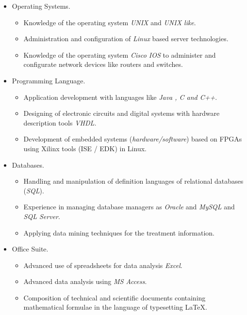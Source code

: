 \documentclass[21pt, onecolumn]{article} %
\begin{document}
\begin{itemize}
  \item Operating Systems.
\begin{itemize}
 \item Knowledge of the operating system \emph{UNIX} and \emph{UNIX like}.
 \item Administration and configuration of \emph{Linux} based server technologies.
  \item Knowledge of the operating system \emph {Cisco IOS} to administer and
 configurate network  devices like routers and switches.

\end{itemize}


\item Programming Language.
\begin{itemize}
 \item Application development with languages like   \emph{Java , C and C++}.
 \item Designing of electronic circuits and digital systems with
hardware description tools \emph{VHDL.}
 \item Development of embedded systems (\emph{hardware/software}) based on
FPGAs using Xilinx tools (ISE / EDK) in Linux.	
\end{itemize}


\item Databases.
\begin{itemize}

 \item Handling and manipulation of definition languages  of
 relational databases (\emph{SQL}).
 \item Experience in managing database managers as \emph{Oracle} and \emph{MySQL} and
 \emph{SQL Server}.
 \item Applying data mining techniques for the treatment
information.
\end{itemize}

\item Office Suite.
\begin{itemize}
 \item Advanced use of spreadsheets for data analysis \emph{Excel}.
 \item Advanced data analysis using  \emph{ MS Access}.
 \item Composition of technical and scientific documents containing mathematical
formulae in the language of typesetting  {\LaTeX}.
\end{itemize}

\end{itemize}
\end{document}
